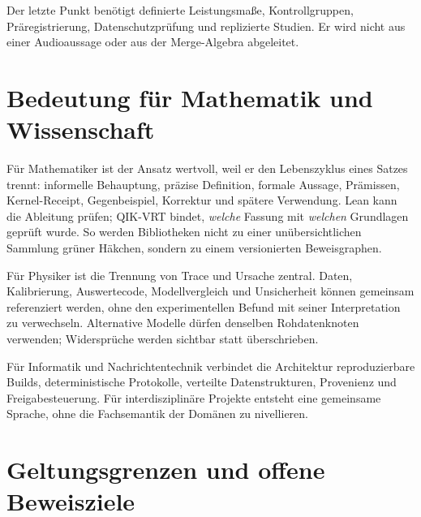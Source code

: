 \documentclass[11pt,a4paper,oneside]{article}
\begin{document}
Der letzte Punkt benötigt definierte Leistungsmaße, Kontrollgruppen,
Präregistrierung, Datenschutzprüfung und replizierte Studien. Er wird nicht aus
einer Audioaussage oder aus der Merge-Algebra abgeleitet.

\section{Bedeutung für Mathematik und Wissenschaft}

Für Mathematiker ist der Ansatz wertvoll, weil er den Lebenszyklus eines
Satzes trennt: informelle Behauptung, präzise Definition, formale Aussage,
Prämissen, Kernel-Receipt, Gegenbeispiel, Korrektur und spätere Verwendung.
Lean kann die Ableitung prüfen; QIK-VRT bindet, \emph{welche} Fassung mit
\emph{welchen} Grundlagen geprüft wurde. So werden Bibliotheken nicht zu einer
unübersichtlichen Sammlung grüner Häkchen, sondern zu einem versionierten
Beweisgraphen.

Für Physiker ist die Trennung von Trace und Ursache zentral. Daten, Kalibrierung,
Auswertecode, Modellvergleich und Unsicherheit können gemeinsam referenziert
werden, ohne den experimentellen Befund mit seiner Interpretation zu
verwechseln. Alternative Modelle dürfen denselben Rohdatenknoten verwenden;
Widersprüche werden sichtbar statt überschrieben.

Für Informatik und Nachrichtentechnik verbindet die Architektur
reproduzierbare Builds, deterministische Protokolle, verteilte Datenstrukturen,
Provenienz und Freigabesteuerung. Für interdisziplinäre Projekte entsteht eine
gemeinsame Sprache, ohne die Fachsemantik der Domänen zu nivellieren.

\section{Geltungsgrenzen und offene Beweisziele}
\end{document}
